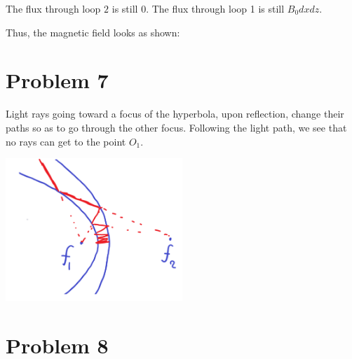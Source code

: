\documentclass[11pt,a4paper]{scrartcl}
\begin{document}
\begin{solution}
\begin{center}
\begin{tikzpicture}[x=0.75pt,y=0.75pt,yscale=-1,xscale=1]
\end{tikzpicture}
\end{center}
The flux through loop $2$ is still $0$. The flux through loop 1 is still $B_0 dx dz$. \par 
Thus, the magnetic field looks as shown:

\end{solution}
\section{Problem 7}
\begin{solution}
Light rays going toward a focus of the hyperbola, upon reflection, change their paths so as to go through the other focus. Following the light path, we see that no rays can get to the point $O_1$.
    \begin{center}
    \includegraphics[width=0.5\textwidth]{okkkkk.png}    
    \end{center}
\end{solution}
\section{Problem 8}
\begin{solution}

\end{solution}
\end{document}
